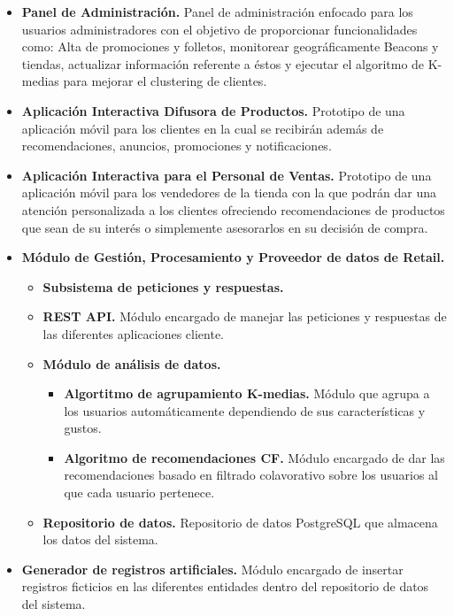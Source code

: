 \begin{itemize}
\item \textbf{Panel de Administración.} Panel de administración enfocado para los usuarios administradores con el objetivo de proporcionar funcionalidades como: Alta de promociones y folletos, monitorear geográficamente Beacons y tiendas, actualizar información referente a éstos y ejecutar el algoritmo de K-medias para mejorar el clustering de clientes.  
\item \textbf{Aplicación Interactiva Difusora de Productos.} Prototipo de una aplicación móvil para los clientes en la cual se recibirán además de recomendaciones, anuncios, promociones y notificaciones.
\item \textbf{Aplicación Interactiva para el Personal de Ventas.} Prototipo de una aplicación móvil para los vendedores de la tienda con la que podrán dar una atención personalizada a los clientes ofreciendo recomendaciones de productos que sean de su interés o simplemente asesorarlos en su decisión de compra. 
\item \textbf{Módulo de Gestión, Procesamiento  y Proveedor de datos de Retail.}
\begin{itemize}
\item \textbf{Subsistema de peticiones y respuestas.}
\item \textbf{REST API.} 	Módulo encargado de manejar las peticiones y respuestas de las diferentes aplicaciones cliente.
\item \textbf{Módulo de análisis de datos.}

\begin{itemize}
\item \textbf{Algortitmo de agrupamiento K-medias.} Módulo que agrupa a los usuarios automáticamente dependiendo de sus características y gustos.
\item \textbf{Algoritmo de recomendaciones CF.} Módulo encargado de dar las recomendaciones basado en filtrado colavorativo sobre los usuarios al que cada usuario pertenece.
\end{itemize}

\item \textbf{Repositorio de datos.} Repositorio de datos PostgreSQL que almacena los datos del sistema.
\end{itemize}
\item \textbf{Generador de registros artificiales.} Módulo encargado de insertar registros ficticios en las diferentes entidades dentro del repositorio de datos del sistema.


\end{itemize}
